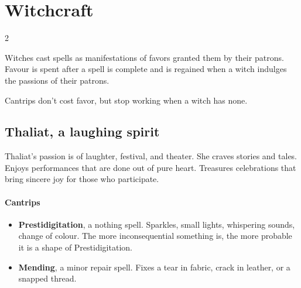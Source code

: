 \documentclass{osr-template/zine}
\begin{document}
\newpage
\section*{\centering \fontsize{35}{45}\selectfont Witchcraft}
\vspace*{0.4 cm}

\begin{multicols*}{2}

\newpage

Witches cast spells as manifestations of favors granted them by their patrons.
Favour is spent after a spell is complete and is regained when a witch indulges the passions of their patrons.

Cantrips don't cost favor, but stop working when a witch has none.

\subsection*{Thaliat, a laughing spirit}

Thaliat's passion is of laughter, festival, and theater.
She craves stories and tales.
Enjoys performances that are done out of pure heart.
Treasures celebrations that bring sincere joy for those who participate.

\paragraph{Cantrips}
\begin{itemize}[nosep]
    \item[\ding{108}] \textbf{Prestidigitation}, a nothing spell. Sparkles, small lights, whispering sounds, change of colour.
 The more inconsequential something is, the more probable it is a shape of Prestidigitation.
    \item[\ding{108}] \textbf{Mending}, a minor repair spell. Fixes a tear in fabric, crack in leather, or a snapped thread.
\end{itemize}


\end{multicols*}
\end{document}
